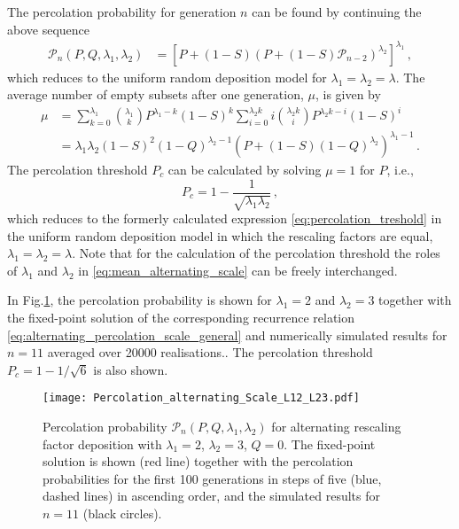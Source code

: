 \documentclass[amsmath,amssymb,amsfonts,aps,pre,preprint,superscriptaddress,bibnotes,showpacs,showkeys,longbibliography,nofootinbib]{revtex4-1}
\begin{document}
The percolation probability for generation $n$ can be found by continuing the above sequence
\begin{equation}
    \label{eq:alternating_percolation_scale_general}
    \begin{split}
        \mathcal{P}_n(P,Q,\lambda_1,\lambda_2) &=\left[P + (1-S) \left(P +(1-S) \mathcal{P}_{n-2}\right)^{\lambda_2}\right]^{\lambda_1}\, ,
    \end{split}
\end{equation}
which reduces to the uniform random deposition model for $\lambda_1 = \lambda_2 = \lambda$. The average number of empty subsets after one generation, $\mu$,  is given by 
\begin{equation}
    \label{eq:mean_alternating_scale}
    \begin{split}
        \mu &= \sum\limits_{k=0}^{\lambda_1} {\lambda_1 \choose k} P^{\lambda_1 -k} (1-S)^k \sum\limits_{i=0}^{\lambda_2 k} i {\lambda_2 k \choose i} P^{\lambda_2 k-i} (1-S)^i\\
        &= \lambda_1 \lambda_2 (1-S)^2 (1-Q)^{\lambda_2-1}\left(P + (1-S)(1-Q)^{\lambda_2}\right)^{\lambda_1-1}\, .
    \end{split}
\end{equation}
The percolation threshold $P_c$ can be calculated by solving $\mu =1$ for $P$, i.e., 
\begin{equation}
    \label{eq:percolation_threshold_alternating_scale}
    P_c = 1-\frac{1}{\sqrt{\lambda_1 \lambda_2}}\, ,
\end{equation}
which reduces to the formerly calculated expression \eqref{eq:percolation_treshold} in the uniform random deposition model in which the rescaling factors are equal, $\lambda_1=\lambda_2=\lambda$. Note that for the calculation of the percolation threshold the roles of $\lambda_1$ and $\lambda_2$ in \eqref{eq:mean_alternating_scale} can be freely interchanged. 

In Fig.\ref{fig:perc_alt_scale}, the percolation probability is shown for $\lambda_1 = 2$ and $\lambda_2 = 3$ together with the fixed-point solution of the corresponding recurrence relation \eqref{eq:alternating_percolation_scale_general} and numerically simulated results for $n=11$ averaged over 20000 realisations.. The percolation threshold $P_c = 1-1/\sqrt{6}$ is also shown.
\begin{figure}[!htp]
    \centering
    \texttt{[image: Percolation\_alternating\_Scale\_L12\_L23.pdf]}
    \caption{Percolation probability $ \mathcal{P}_n(P,Q,\lambda_1,\lambda_2)$ for alternating rescaling factor deposition with $\lambda_1 = 2$, $\lambda_2 = 3$, $Q=0$. The fixed-point solution is shown (red line) together with the percolation probabilities for the first 100 generations in steps of five (blue, dashed lines) in ascending order, and the simulated results for $n=11$ (black circles).}
    \label{fig:perc_alt_scale}
\end{figure}
\end{document}
